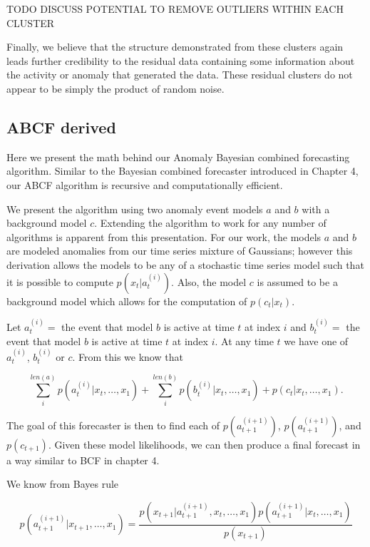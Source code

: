TODO DISCUSS POTENTIAL TO REMOVE OUTLIERS WITHIN EACH CLUSTER

Finally, we believe that the structure demonstrated from these clusters again leads further credibility to the residual data containing some information about the activity or anomaly that generated the data.  These residual clusters do not appear to be simply the product of random noise.  


\subsection{ABCF derived}
\label{sec:abcf}
Here we present the math behind our Anomaly Bayesian combined forecasting algorithm.  Similar to the Bayesian combined forecaster introduced in Chapter 4, our ABCF algorithm is recursive and computationally efficient.  

We present the algorithm using two anomaly event models $a$ and $b$ with a background model $c$.  Extending the algorithm to work for any number of algorithms is apparent from this presentation.  For our work, the models $a$ and $b$ are modeled anomalies from our time series mixture of Gaussians; however this derivation allows the models to be any of a stochastic time series model such that it is possible to compute $p(x_{t} | a^{(i)}_{t})$.  Also, the model $c$ is assumed to be a background model which allows for the computation of $p(c_{t}|x_{t})$.  

Let $a_{t}^{(i)} = $ the event that model $b$ is active at time $t$ at index $i$ and $b_{t}^{(i)} = $ the event that model $b$ is active at time $t$ at index $i$.  At any time $t$ we have one of ${a^{(i)}_{t}}$, ${b^{(i)}_{t}}$ or $c$.  From this we know that 

\begin{equation}
\sum_{i}^{len(a)} p(a_{t}^{(i)}|x_{t}, \ldots, x_{1}) + \sum_{i}^{len(b)} p(b_{t}^{(i)}|x_{t}, \ldots, x_{1}) + p(c_{t}|x_{t}, \ldots, x_{1}).
\end{equation}

The goal of this forecaster is then to find each of $p(a_{t + 1}^{(i + 1)})$, $p(a_{t + 1}^{(i + 1)})$, and $p(c_{t + 1}).$  Given these model likelihoods, we can then produce a final forecast in a way similar to BCF in chapter 4.

We know from Bayes rule 

\begin {equation}
p(a_{t + 1}^{(i + 1)}|x_{t + 1}, \ldots, x_{1}) =
		\frac{p(x_{t + 1}|a^{(i + 1)}_{t + 1}, x_{t}, \ldots, x_{1}) p(a_{t + 1}^{(i + 1)}|x_{t}, \ldots, x_{1})}
	       {p(x_{t + 1})}
\end{equation}

